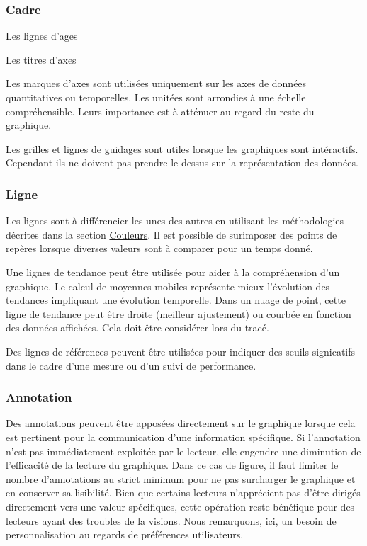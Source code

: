 \documentclass[a4paper,12pt]{article}
\begin{document}
\begin{multicols}{2}
\subsubsection*{Cadre}
\label{sec:org1d03d2e}
Les lignes d'ages

Les titres d'axes

Les marques d'axes sont utilisées uniquement sur les axes de données quantitatives ou temporelles. Les unitées sont arrondies à une échelle compréhensible. Leurs importance est à atténuer au regard du reste du graphique. \autocite{stephenfewComponentlevelGraphDesign2012}

Les grilles et lignes de guidages sont utiles lorsque les graphiques sont intéractifs. Cependant ils ne doivent pas prendre le dessus sur la représentation des données. \autocite{dougschepersDesigningDataCognitive2022}
\subsubsection*{Ligne}
\label{sec:org876a8c5}
Les lignes sont à différencier les unes des autres en utilisant les méthodologies décrites dans la section \hyperref[sec:orgec595e2]{Couleurs}. Il est possible de surimposer des points de repères lorsque diverses valeurs sont à comparer pour un temps donné. \autocite{stephenfewComponentlevelGraphDesign2012}

Une lignes de tendance peut être utilisée pour aider à la compréhension d'un graphique. Le calcul de moyennes mobiles représente mieux l'évolution des tendances impliquant une évolution temporelle. Dans un nuage de point, cette ligne de tendance peut être droite (meilleur ajustement) ou courbée en fonction des données affichées. Cela doit être considérer lors du tracé. \autocite{stephenfewComponentlevelGraphDesign2012}

Des lignes de références peuvent être utilisées pour indiquer des seuils signicatifs dans le cadre d'une mesure ou d'un suivi de performance. \autocite{stephenfewComponentlevelGraphDesign2012}
\subsubsection*{Annotation}
\label{sec:org5e85c30}
Des annotations peuvent être apposées directement sur le graphique lorsque cela est pertinent pour la communication d'une information spécifique. Si l'annotation n'est pas immédiatement exploitée par le lecteur, elle engendre une diminution de l'efficacité de la lecture du graphique. \autocite{tranDiscoveringAccessibleData2024} Dans ce cas de figure, il faut limiter le nombre d'annotations au strict minimum pour ne pas surcharger le graphique et en conserver sa lisibilité. \autocite{stephenfewComponentlevelGraphDesign2012} Bien que certains lecteurs n'apprécient pas d'être dirigés directement vers une valeur spécifiques, \autocite{tranDiscoveringAccessibleData2024} cette opération reste bénéfique pour des lecteurs ayant des troubles de la visions. \autocite{dougschepersDesigningDataCognitive2022} Nous remarquons, ici, un besoin de personnalisation au regards de préférences utilisateurs.

\end{multicols}
\end{document}
